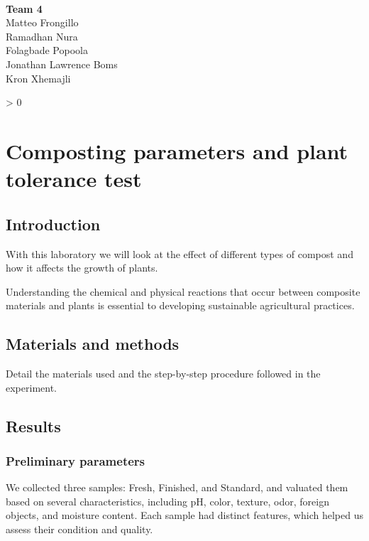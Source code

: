 \documentclass{article}
\makeatletter
\newcommand{\wrapfill}{
    \par
    \ifnum \value{WF@wrappedlines} > 0
        \addtocounter{WF@wrappedlines}{-1}%
        \null\vspace{
            \arabic{WF@wrappedlines}
            \baselineskip
        }
        \WFclear
    \fi
    \phantom{}
}
\makeatother
\begin{document}
\phantom{}\\[-1cm]

\begin{flushright}
        \large
        \textbf{Team 4}\\
        Matteo Frongillo\\
        Ramadhan Nura\\
        Folagbade Popoola\\
        Jonathan Lawrence Boms\\
        Kron Xhemajli
\end{flushright}
\wrapfill

\tableofcontents
\pagebreak

\section{Composting parameters and plant tolerance test}
\subsection{Introduction}
With this laboratory we will look at the effect of different types of
compost and how it affects the growth of plants. 

Understanding the chemical and physical reactions that occur between
composite materials and plants is essential to developing sustainable
agricultural practices.

\subsection{Materials and methods}
Detail the materials used and the step-by-step procedure followed in the experiment.

\subsection{Results}
\subsubsection{Preliminary parameters}
We collected three samples: Fresh, Finished, and Standard, and 
valuated them based on several characteristics, including pH, color,
texture, odor, foreign objects, and moisture content. Each sample had
distinct features, which helped us assess their condition and quality. 
\end{document}
